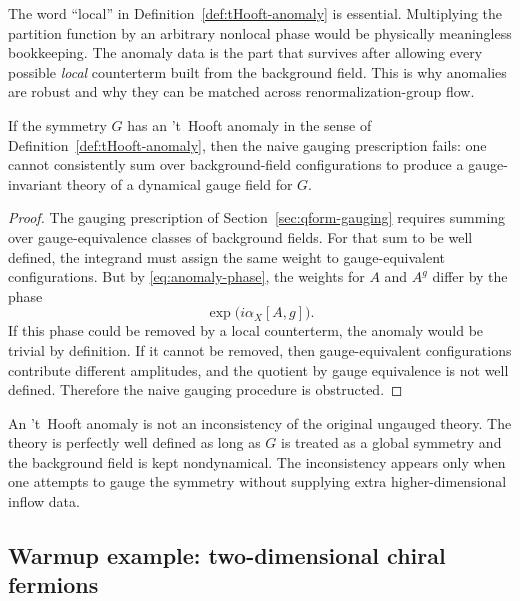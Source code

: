 \begin{remark}\label{rem:anomaly-locality}
The word ``local'' in Definition~\ref{def:tHooft-anomaly} is essential. Multiplying the partition function by an arbitrary nonlocal phase would be physically meaningless bookkeeping. The anomaly data is the part that survives after allowing every possible \emph{local} counterterm built from the background field. This is why anomalies are robust and why they can be matched across renormalization-group flow.
\end{remark}

\begin{proposition}\label{prop:anomaly-obstruction}
If the symmetry $G$ has an 't~Hooft anomaly in the sense of Definition~\ref{def:tHooft-anomaly}, then the naive gauging prescription fails: one cannot consistently sum over background-field configurations to produce a gauge-invariant theory of a dynamical gauge field for $G$.
\end{proposition}

\begin{proof}
The gauging prescription of Section~\ref{sec:qform-gauging} requires summing over gauge-equivalence classes of background fields. For that sum to be well defined, the integrand must assign the same weight to gauge-equivalent configurations. But by \eqref{eq:anomaly-phase}, the weights for $A$ and $A^g$ differ by the phase
\begin{equation*}
\exp\!\bigl(i\alpha_X[A,g]\bigr).
\end{equation*}
If this phase could be removed by a local counterterm, the anomaly would be trivial by definition. If it cannot be removed, then gauge-equivalent configurations contribute different amplitudes, and the quotient by gauge equivalence is not well defined. Therefore the naive gauging procedure is obstructed.
\end{proof}

\begin{remark}\label{rem:anomaly-not-inconsistency}
An 't~Hooft anomaly is not an inconsistency of the original ungauged theory. The theory is perfectly well defined as long as $G$ is treated as a global symmetry and the background field is kept nondynamical. The inconsistency appears only when one attempts to gauge the symmetry without supplying extra higher-dimensional inflow data.
\end{remark}

\subsection{Warmup example: two-dimensional chiral fermions}

